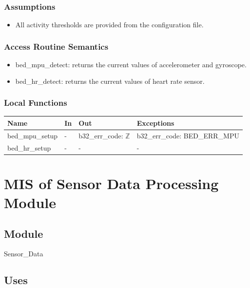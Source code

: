 \documentclass[12pt, titlepage]{article}
\begin{document}
\subsubsection{Assumptions}
\begin{itemize}
\item All activity thresholds are provided from the configuration file.
\end{itemize}

\subsubsection{Access Routine Semantics}
\begin{itemize}
\item bed\_mpu\_detect: returns the current values of accelerometer and gyroscope.
\item bed\_hr\_detect: returns the current values of heart rate sensor.
\end{itemize}

\subsubsection{Local Functions}
\begin{center}
\begin{tabular}{p{4cm} p{4cm} p{3.5cm} p{3.6cm}}
\hline
\textbf{Name} & \textbf{In} & \textbf{Out} & \textbf{Exceptions} \\
\hline
bed\_mpu\_setup & - & b32\_err\_code: $\mathbb{Z}$ & b32\_err\_code: BED\_ERR\_MPU \\
bed\_hr\_setup & - & - & - \\
\hline
\end{tabular}
\end{center}

\newpage

\section{MIS of Sensor Data Processing Module} \label{mSA2} 

\subsection{Module}

Sensor\_Data

\subsection{Uses}
\end{document}
